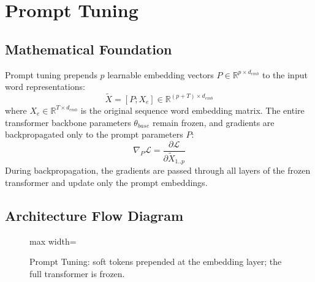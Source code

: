 \newpage
\section{Prompt Tuning}

\subsection{Mathematical Foundation}
Prompt tuning prepends $p$ learnable embedding vectors $P \in \mathbb{R}^{p \times d_{emb}}$ to the input word representations:
\begin{equation}
  \tilde{X} = [P ; X_e] \in \mathbb{R}^{(p + T) \times d_{emb}}
\end{equation}
where $X_e \in \mathbb{R}^{T \times d_{emb}}$ is the original sequence word embedding matrix. The entire transformer backbone parameters $\theta_{base}$ remain frozen, and gradients are backpropagated only to the prompt parameters $P$:
\begin{equation}
  \nabla_P \mathcal{L} = \frac{\partial \mathcal{L}}{\partial \tilde{X}_{1..p}}
\end{equation}
During backpropagation, the gradients are passed through all layers of the frozen transformer and update only the prompt embeddings.

\subsection{Architecture Flow Diagram}

\begin{figure}[h]
\centering
\begin{adjustbox}{max width=\linewidth}
\end{adjustbox}
\caption{Prompt Tuning: soft tokens prepended at the embedding layer; the full transformer is frozen.}
\end{figure}

